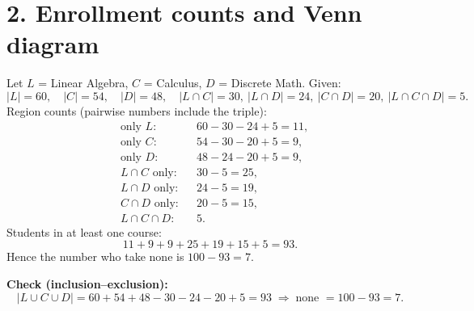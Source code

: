 \section*{2. Enrollment counts and Venn diagram}

Let $L$ = Linear Algebra, $C$ = Calculus, $D$ = Discrete Math. Given:
\[
|L|=60,\quad |C|=54,\quad |D|=48,\quad
|L\cap C|=30,\ |L\cap D|=24,\ |C\cap D|=20,\ |L\cap C\cap D|=5.
\]
Region counts (pairwise numbers include the triple):
\[
\begin{aligned}
&\text{only }L: &&60-30-24+5=11,\\
&\text{only }C: &&54-30-20+5=9,\\
&\text{only }D: &&48-24-20+5=9,\\
&L\cap C \text{ only:} &&30-5=25,\\
&L\cap D \text{ only:} &&24-5=19,\\
&C\cap D \text{ only:} &&20-5=15,\\
&L\cap C\cap D: &&5.
\end{aligned}
\]
Students in at least one course:
\[
11+9+9+25+19+15+5 = 93.
\]
Hence the number who take none is $100-93=\boxed{7}$.

\medskip
\noindent\textbf{Check (inclusion–exclusion):}
\[
|L\cup C\cup D|=60+54+48-30-24-20+5=93\;\Rightarrow\; \text{none }=100-93=7.
\]

\begin{center}
\end{center}
